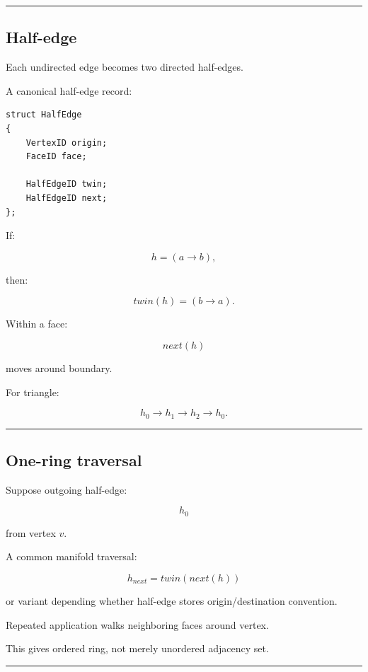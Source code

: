 \begin{center}\rule{0.5\linewidth}{0.5pt}\end{center}

\subsection{Half-edge}\label{04-visual-computing-ii-ch041-half-edge}

Each undirected edge becomes two directed half-edges.

A canonical half-edge record:

\begin{verbatim}
struct HalfEdge
{
    VertexID origin;
    FaceID face;

    HalfEdgeID twin;
    HalfEdgeID next;
};
\end{verbatim}

If:

\[
h=(a\rightarrow b),
\]

then:

\[
twin(h)
=
(b\rightarrow a).
\]

Within a face:

\[
next(h)
\]

moves around boundary.

For triangle:

\[
h_0\rightarrow h_1\rightarrow h_2\rightarrow h_0.
\]

\begin{center}\rule{0.5\linewidth}{0.5pt}\end{center}

\subsection{One-ring traversal}\label{04-visual-computing-ii-ch041-one-ring-traversal}

Suppose outgoing half-edge:

\[
h_0
\]

from vertex \(v\).

A common manifold traversal:

\[
\boxed{
h_{next}
=
twin(next(h))
}
\]

or variant depending whether half-edge stores origin/destination convention.

Repeated application walks neighboring faces around vertex.

This gives ordered ring, not merely unordered adjacency set.

\begin{center}\rule{0.5\linewidth}{0.5pt}\end{center}

